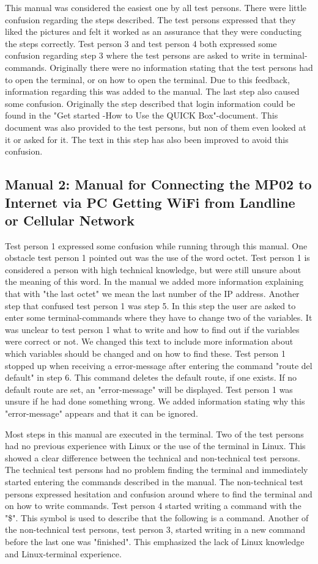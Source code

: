 This manual was considered the easiest one by all test persons. There were little confusion regarding the steps described. The test persons expressed that they liked the pictures and felt it worked as an assurance that they were conducting the steps correctly. Test person 3 and test person 4 both expressed some confusion regarding step 3 where the test persons are asked to write in terminal-commands. Originally there were no information stating that the test persons had to open the terminal, or on how to open the terminal. Due to this feedback, information regarding this was added to the manual. The last step also caused some confusion. Originally the step described that login information could be found in the "Get started -How to Use the QUICK Box"-document. This document was also provided to the test persons, but non of them even looked at it or asked for it. The text in this step has also been improved to avoid this confusion. 

\subsection{Manual 2: Manual for Connecting the MP02 to Internet via PC Getting WiFi from Landline or Cellular Network}
Test person 1 expressed some confusion while running through this manual. One obstacle test person 1 pointed out was the use of the word octet. Test person 1 is considered a person with high technical knowledge, but were still unsure about the meaning of this word. In the manual we added more information explaining that with "the last octet" we mean the last number of the IP address. Another step that confused test person 1 was step 5. In this step the user are asked to enter some terminal-commands where they have to change two of the variables. It was unclear to test person 1 what to write and how to find out if the variables were correct or not. We changed this text to include more information about which variables should be changed and on how to find these. Test person 1 stopped up when receiving a error-message after entering the command "route del default" in step 6. This command deletes the default route, if one exists. If no default route are set, an "error-message" will be displayed. Test person 1 was unsure if he had done something wrong. We added information stating why this "error-message" appears and that it can be ignored. 

Most steps in this manual are executed in the terminal. Two of the test persons had no previous experience with Linux or the use of the terminal in Linux. This showed a clear difference between the technical and non-technical test persons. The technical test persons had no problem finding the terminal and immediately started entering the commands described in the manual. The non-technical test persons expressed hesitation and confusion around where to find the terminal and on how to write commands. Test person 4 started writing a command with the "\$". This symbol is used to describe that the following is a command. Another of the non-technical test persons, test person 3, started writing in a new command before the last one was "finished". This emphasized the lack of Linux knowledge and Linux-terminal experience.   

